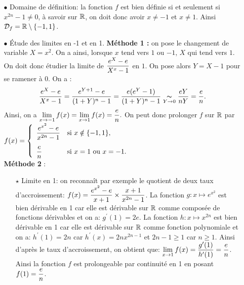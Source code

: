 \documentclass[a4paper, 11pt,reqno]{article}
\begin{document}
\begin{correction}   \;
	\begin{itemize}
		\item[$\bullet$] Domaine de d\'efinition: la fonction $f$ est bien d\'efinie si et seulement si $x^{2n}-1\not= 0$, \`{a} savoir sur $\mathbb{R}$, on doit donc avoir $x\not= -1$ et $x\not= 1$. Ainsi $\mathcal{D}_f=\mathbb{R}\setminus\lbrace -1,1\rbrace$.
		\item[$\bullet$] \'Etude des limites en -1 et en 1.
		      \textbf{M\'ethode 1 :} on pose le changement de variable $X=x^2$. On a ainsi, lorsque $x$ tend vers $1$ ou $-1$, $X$ qui tend vers $1$. On doit donc \'etudier la limite de $\displaystyle \frac{e^X-e}{X^x-1}$ en $1$. On  pose alors $Y=X-1$ pour se ramener \`a $0$. On a :
		      $$\displaystyle \frac{e^X-e}{X^x-1} = \frac{e^{Y+1}-e}{(1+Y)^n-1} = \frac{e(e^Y-1)}{(1+Y)^n - 1} \underset{Y\to 0}{\thicksim} \frac{eY}{nY} = \frac{e}{n}.$$
		      Ainsi, on a $\lim\limits_{x\to -1} f(x)=\lim\limits_{x\to 1} f(x)=\displaystyle\frac{e}{n}.$ On peut donc prolonger $f$ sur $\mathbb{R}$ par
		      $f(x)=\left\lbrace \begin{array}{ll} \ddp\frac{e^{x^2}-e}{x^{2n}-1}& \hbox{si}\ x\notin \lbrace -1,1\rbrace,\vsec\\ \ddp\frac{e}{n} & \hbox{si}\ x=1 \hbox{ ou } x=-1.\end{array}\right.$\vsec\\
		      \textbf{M\'ethode 2} :
		      \begin{itemize}
			      \item[$\star$] Limite en 1: on reconna\^{i}t par exemple le quotient de deux taux d'accroissement:
			            $f(x)=\displaystyle\frac{e^{x^2}-e}{x+1}\times \displaystyle\frac{x+1}{x^{2n}-1}$. La fonction $g: x\mapsto e^{x^2}$ est bien d\'erivable en 1 car elle est d\'erivable sur $\mathbb{R}$ comme compos\'ee de fonctions d\'erivables et on a: $g^{\prime}(1)=2e$. La fonction $h: x\mapsto x^{2n}$ est bien d\'erivable en 1 car elle est d\'erivable sur $\mathbb{R}$ comme fonction polynomiale et on a: $h^{\prime}(1)=2n$ car $h^{\prime}(x)=2nx^{2n-1}$ et $2n-1\geq 1$ car $n\geq 1$. Ainsi d'apr\`{e}s le taux d'accroissement, on obtient que: $\lim\limits_{x\to 1} f(x)=\displaystyle\frac{g^{\prime}(1)}{h^{\prime}(1)}=\displaystyle\frac{e}{n}$. Ainsi la fonction $f$ est prolongeable par continuit\'e en 1 en posant $f(1)=\displaystyle\frac{e}{n}$. %

\end{itemize}
\end{itemize}
\end{correction}
\end{document}
